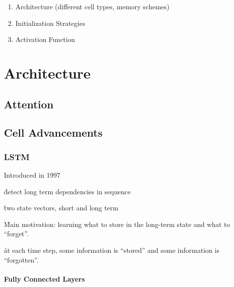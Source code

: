 \begin{enumerate}[noitemsep,topsep=0pt]
	\item Architecture (different cell types, memory schemes)
	\item Initialization Strategies
	\item Activation Function
\end{enumerate}




\section{Architecture}


\subsection{Attention}



\subsection{Cell Advancements}

\subsubsection{LSTM}

Introduced in 1997 %

\r{detect long term dependencies in sequence}

\r{two state vectors, short and long term}

\r{Main motivation: learning what to store in the long-term state and what to ``forget''.}

\r{at each time step, some information is ``stored'' and some information is ``forgotten''.}

\paragraph{Fully Connected Layers}


